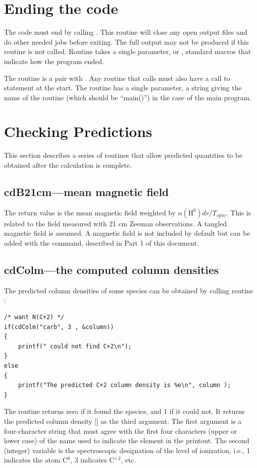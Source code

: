 \section{Ending the code}

The code must end by calling .
This routine will close any open
output files and do other needed jobs before exiting.
The full output may
not be produced if this routine is not called.
Routine  takes a single
parameter,  or ,
standard macros that indicate how
the program ended.

The routine  is a pair with .
Any routine that calls
 must also have a call to  statement at the start.  The
routine  has a single parameter, a string giving the name of
the routine (which should be ``main()'') in the case of the main program.

\section{Checking Predictions}

This section describes a series of routines that allow predicted
quantities to be obtained after the calculation is complete.

\subsection{cdB21cm---mean magnetic field}

The return value is the mean magnetic field weighted by
$n(\mathrm{H}^0) dr/T_{spin}$.
This is related to the field measured with 21 cm Zeeman
observations.
A tangled magnetic field is assumed.
A magnetic field is
not included by default but can be added with the
 command, described in Part 1 of this document.

\subsection{cdColm---the computed column densities }
\label{sec:SubroutineCdColm}

The predicted column densities of some species can be obtained by
calling routine :
\begin{verbatim}
/* want N(C+2) */
if(cdColm("carb", 3 , &column))
{
    printf(" could not find C+2\n");
}
else
{
    printf("The predicted C+2 column density is %e\n", column );
}
\end{verbatim}
The routine returns zero if it found the species, and 1 if it could not.
It returns the predicted column density [\pscm] as the third argument.  The
first argument  is a four-character string that must agree with the
first four characters (upper or lower case) of the name used to indicate
the element in the printout.
The second (integer) variable  is the
spectroscopic designation of the level of ionization, i.e., 1 indicates
the atom C$^0$, 3 indicates C$^{+2}$, etc.

